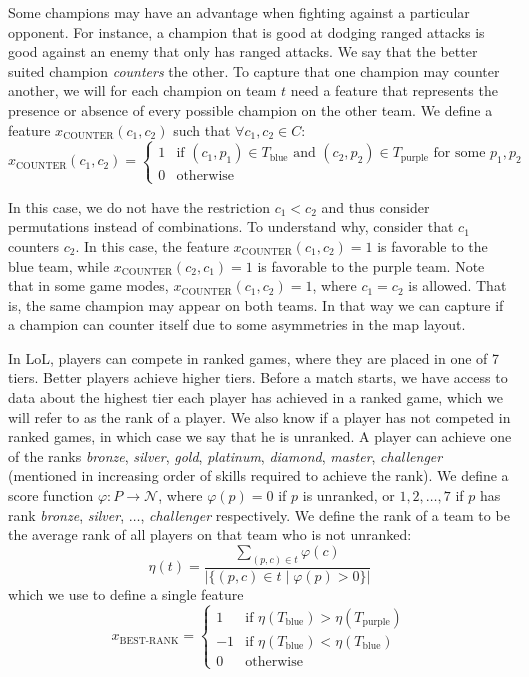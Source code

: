 Some champions may have an advantage when fighting against a particular opponent.
For instance, a champion that is good at dodging ranged attacks is good against an enemy that only has ranged attacks.
We say that the better suited champion \emph{counters} the other.
To capture that one champion may counter another, we will for each champion on team $t$ need a feature that represents the presence or absence of every possible champion on the other team.
We define a feature $x_\text{COUNTER}(c_1, c_2)$ such that $\forall c_1, c_2 \in C:$
\[x_\text{COUNTER}(c_1, c_2) = 
\begin{cases} 
1 & \text{if } (c_1, p_1) \in T_\text{blue} \text{ and } (c_2, p_2) \in T_\text{purple} \text{ for some } p_1, p_2 \\ 
0 & \text{otherwise} 
\end{cases}\]

In this case, we do not have the restriction $c_1 < c_2$ and thus consider permutations instead of combinations.
To understand why, consider that $c_1$ counters $c_2$.
In this case, the feature $x_\text{COUNTER}(c_1, c_2) = 1$ is favorable to the blue team, while $x_\text{COUNTER}(c_2, c_1) = 1$ is favorable to the purple team.
Note that in some game modes, $x_\text{COUNTER}(c_1, c_2) = 1$, where $c_1 = c_2$ is allowed. That is, the same champion may appear on both teams.
In that way we can capture if a champion can counter itself due to some asymmetries in the map layout.

In LoL, players can compete in ranked games, where they are placed in one of 7 tiers. Better players achieve higher tiers.
Before a match starts, we have access to data about the highest tier each player has achieved in a ranked game, which we will refer to as the rank of a player. We also know if a player has not competed in ranked games, in which case we say that he is unranked.
A player can achieve one of the ranks \textit{bronze}, \textit{silver}, \textit{gold}, \textit{platinum}, \textit{diamond}, \textit{master}, \textit{challenger} (mentioned in increasing order of skills required to achieve the rank).
We define a score function $\varphi : P \rightarrow \mathcal{N}$, where $\varphi(p) = 0$ if $p$ is unranked, or $1, 2, \dots, 7$ if $p$ has rank \textit{bronze}, \textit{silver}, $\dots$, \textit{challenger} respectively.
We define the rank of a team to be the average rank of all players on that team who is not unranked:
\[
\eta(t) = \frac{\sum\limits_{(p, c) \in t} \varphi(c)}{|\{(p, c) \in t \mid \varphi(p) > 0\}|}
\]
which we use to define a single feature
\[
x_\text{BEST-RANK} = 
\begin{cases} 
  1 & \text{if } \eta(T_\text{blue}) > \eta(T_\text{purple})\\
  -1 & \text{if } \eta(T_\text{blue}) < \eta(T_\text{blue})\\
  0 & \text{otherwise} 
\end{cases}
\]

